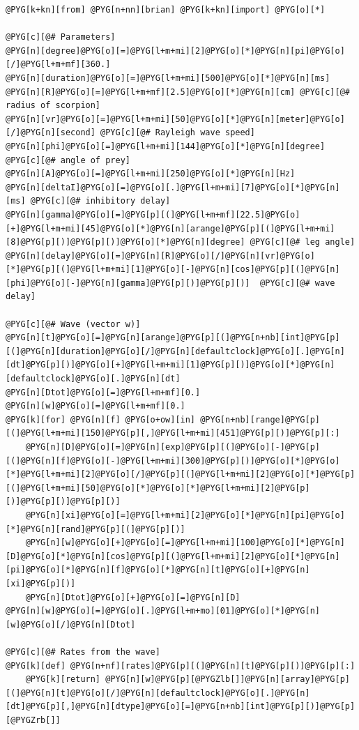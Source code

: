 \documentclass[letterpaper,10pt,english]{manual}
\begin{document}
\begin{Verbatim}[commandchars=@\[\]]
@PYG[k+kn][from] @PYG[n+nn][brian] @PYG[k+kn][import] @PYG[o][*]

@PYG[c][@# Parameters]
@PYG[n][degree]@PYG[o][=]@PYG[l+m+mi][2]@PYG[o][*]@PYG[n][pi]@PYG[o][/]@PYG[l+m+mf][360.]
@PYG[n][duration]@PYG[o][=]@PYG[l+m+mi][500]@PYG[o][*]@PYG[n][ms]
@PYG[n][R]@PYG[o][=]@PYG[l+m+mf][2.5]@PYG[o][*]@PYG[n][cm] @PYG[c][@# radius of scorpion]
@PYG[n][vr]@PYG[o][=]@PYG[l+m+mi][50]@PYG[o][*]@PYG[n][meter]@PYG[o][/]@PYG[n][second] @PYG[c][@# Rayleigh wave speed]
@PYG[n][phi]@PYG[o][=]@PYG[l+m+mi][144]@PYG[o][*]@PYG[n][degree] @PYG[c][@# angle of prey]
@PYG[n][A]@PYG[o][=]@PYG[l+m+mi][250]@PYG[o][*]@PYG[n][Hz]
@PYG[n][deltaI]@PYG[o][=]@PYG[o][.]@PYG[l+m+mi][7]@PYG[o][*]@PYG[n][ms] @PYG[c][@# inhibitory delay]
@PYG[n][gamma]@PYG[o][=]@PYG[p][(]@PYG[l+m+mf][22.5]@PYG[o][+]@PYG[l+m+mi][45]@PYG[o][*]@PYG[n][arange]@PYG[p][(]@PYG[l+m+mi][8]@PYG[p][)]@PYG[p][)]@PYG[o][*]@PYG[n][degree] @PYG[c][@# leg angle]
@PYG[n][delay]@PYG[o][=]@PYG[n][R]@PYG[o][/]@PYG[n][vr]@PYG[o][*]@PYG[p][(]@PYG[l+m+mi][1]@PYG[o][-]@PYG[n][cos]@PYG[p][(]@PYG[n][phi]@PYG[o][-]@PYG[n][gamma]@PYG[p][)]@PYG[p][)]  @PYG[c][@# wave delay]

@PYG[c][@# Wave (vector w)]
@PYG[n][t]@PYG[o][=]@PYG[n][arange]@PYG[p][(]@PYG[n+nb][int]@PYG[p][(]@PYG[n][duration]@PYG[o][/]@PYG[n][defaultclock]@PYG[o][.]@PYG[n][dt]@PYG[p][)]@PYG[o][+]@PYG[l+m+mi][1]@PYG[p][)]@PYG[o][*]@PYG[n][defaultclock]@PYG[o][.]@PYG[n][dt]
@PYG[n][Dtot]@PYG[o][=]@PYG[l+m+mf][0.]
@PYG[n][w]@PYG[o][=]@PYG[l+m+mf][0.]
@PYG[k][for] @PYG[n][f] @PYG[o+ow][in] @PYG[n+nb][range]@PYG[p][(]@PYG[l+m+mi][150]@PYG[p][,]@PYG[l+m+mi][451]@PYG[p][)]@PYG[p][:]
    @PYG[n][D]@PYG[o][=]@PYG[n][exp]@PYG[p][(]@PYG[o][-]@PYG[p][(]@PYG[n][f]@PYG[o][-]@PYG[l+m+mi][300]@PYG[p][)]@PYG[o][*]@PYG[o][*]@PYG[l+m+mi][2]@PYG[o][/]@PYG[p][(]@PYG[l+m+mi][2]@PYG[o][*]@PYG[p][(]@PYG[l+m+mi][50]@PYG[o][*]@PYG[o][*]@PYG[l+m+mi][2]@PYG[p][)]@PYG[p][)]@PYG[p][)]
    @PYG[n][xi]@PYG[o][=]@PYG[l+m+mi][2]@PYG[o][*]@PYG[n][pi]@PYG[o][*]@PYG[n][rand]@PYG[p][(]@PYG[p][)]
    @PYG[n][w]@PYG[o][+]@PYG[o][=]@PYG[l+m+mi][100]@PYG[o][*]@PYG[n][D]@PYG[o][*]@PYG[n][cos]@PYG[p][(]@PYG[l+m+mi][2]@PYG[o][*]@PYG[n][pi]@PYG[o][*]@PYG[n][f]@PYG[o][*]@PYG[n][t]@PYG[o][+]@PYG[n][xi]@PYG[p][)]
    @PYG[n][Dtot]@PYG[o][+]@PYG[o][=]@PYG[n][D]
@PYG[n][w]@PYG[o][=]@PYG[o][.]@PYG[l+m+mo][01]@PYG[o][*]@PYG[n][w]@PYG[o][/]@PYG[n][Dtot]

@PYG[c][@# Rates from the wave]
@PYG[k][def] @PYG[n+nf][rates]@PYG[p][(]@PYG[n][t]@PYG[p][)]@PYG[p][:]
    @PYG[k][return] @PYG[n][w]@PYG[p][@PYGZlb[]]@PYG[n][array]@PYG[p][(]@PYG[n][t]@PYG[o][/]@PYG[n][defaultclock]@PYG[o][.]@PYG[n][dt]@PYG[p][,]@PYG[n][dtype]@PYG[o][=]@PYG[n+nb][int]@PYG[p][)]@PYG[p][@PYGZrb[]]


\end{Verbatim}
\end{document}
